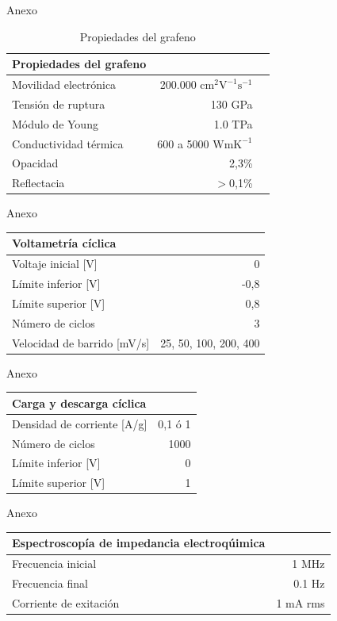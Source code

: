 \documentclass[aspectratio=169]{beamer}
\begin{document}
	\begin{frame}{Anexo}
		\begin{table}[h!]
			\centering
			\begin{tabular}{ l r r }
				Propiedades del grafeno & & \\
				\hline
				Movilidad electrónica & 200.000 $\mathrm{cm^2 V^{-1} s^{-1} }$ & \citep{Bolotin2008}\\
				Tensión de ruptura & 130 GPa & \citep{Lee2008}\\
				Módulo de Young & 1.0 TPa & \citep{Lee2008}\\
				Conductividad térmica & 600 a 5000 $\mathrm{W mK^{-1}}$ & \citep{Balandin2011}\\
				Opacidad & 2,3\% &\citep{Nair2008}\\
				Reflectacia & $>$0,1\% & \citep{Nair2008}\\
			\end{tabular}
			\caption{Propiedades del grafeno}
		\end{table}
	\end{frame}

	\begin{frame}{Anexo}
		\begin{table}[h!]
			\begin{tabular}{ l r }
				Voltametría cíclica &  \\
				\hline
				Voltaje inicial [V] & 0 \\
				Límite inferior [V] & -0,8 \\
				Límite superior [V] & 0,8  \\
				Número de ciclos & 3 \\
				Velocidad de barrido [mV/s] & 25, 50, 100, 200, 400 \\
			\end{tabular}
		\end{table}
	\end{frame}
	\begin{frame}{Anexo}
		\begin{table}[h!]
			\begin{tabular}{ l r }
				Carga y descarga cíclica & \\
				\hline
				Densidad de corriente [A/g] & 0,1 ó 	1 \\
				Número de ciclos & 1000 \\
				Límite inferior [V] & 0 \\
				Límite superior [V] & 1 \\
			\end{tabular}
		\end{table}
	\end{frame}

	\begin{frame}{Anexo}
		\begin{table}[h!]
			\begin{tabular}{ l r }
				Espectroscopía de impedancia electroqúimica & \\
				\hline
				Frecuencia inicial	&	1 MHz \\
				Frecuencia final	&	0.1 Hz \\
				Corriente de exitación & 1 mA rms \\ 
			\end{tabular}
		\end{table}
	\end{frame}	
\end{document}
